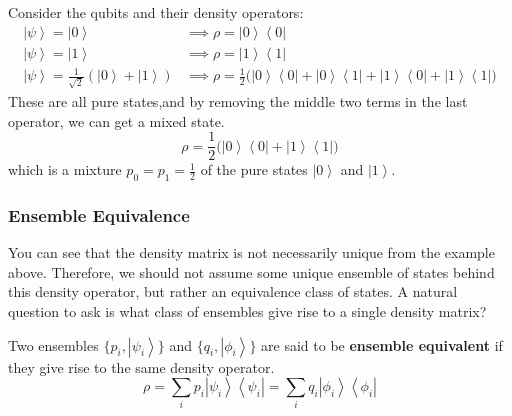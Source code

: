 \documentclass{article}
\newcommand{\ket}[1]{\ensuremath{\left|#1\right\rangle}}
\newcommand{\bra}[1]{\ensuremath{\left\langle#1\right|}}
\begin{document}
    \begin{example}
      Consider the qubits and their density operators: 
      \begin{align} 
        \ket{\psi} = \ket{0} & \implies \rho = \ket{0} \bra{0} \\
        \ket{\psi} = \ket{1} & \implies \rho = \ket{1} \bra{1} \\
        \ket{\psi} = \frac{1}{\sqrt{2}} ( \ket{0} + \ket{1}) & \implies \rho = \frac{1}{2} \big( \ket{0} \bra{0} + \ket{0} \bra{1} + \ket{1} \bra{0} + \ket{1} \bra{1} \big) 
      \end{align}
      These are all pure states,and by removing the middle two terms in the last operator, we can get a mixed state. 
      \begin{equation} 
        \rho = \frac{1}{2} \big( \ket{0} \bra{0} + \ket{1} \bra{1} \big) 
      \end{equation}
      which is a mixture $p_0 = p_1 = \frac{1}{2}$ of the pure states $\ket{0}$ and $\ket{1}$. 
    \end{example}

    \subsubsection{Ensemble Equivalence}

      You can see that the density matrix is not necessarily unique from the example above. Therefore, we should not assume some unique ensemble of states behind this density operator, but rather an equivalence class of states. A natural question to ask is what class of ensembles give rise to a single density matrix? 

      \begin{definition}
        Two ensembles $\{p_i, \ket{\psi_i}\}$ and $\{q_i, \ket{\phi_i}\}$ are said to be \textbf{ensemble equivalent} if they give rise to the same density operator. 
        \begin{equation}
          \rho = \sum_i p_i \ket{\psi_i} \bra{\psi_i} = \sum_i q_i \ket{\phi_i} \bra{\phi_i}
        \end{equation}
      \end{definition}
\end{document}
